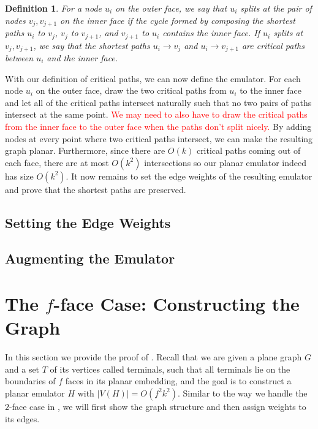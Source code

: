\documentclass[11pt]{article}
\newtheorem{definition}[theorem]{Definition}
\begin{document}
\begin{definition}
    For a node $u_i$ on the outer face, we say that $u_i$ splits at the pair of nodes $v_j,v_{j+1}$ on the inner face if the cycle formed by composing the shortest paths $u_i$ to $v_j$, $v_j$ to $v_{j+1}$, and $v_{j+1}$ to $u_i$ contains the inner face. If $u_i$ splits at $v_j,v_{j+1}$, we say that the shortest paths $u_i\to v_j$ and $u_i\to v_{j+1}$ are critical paths between $u_i$ and the inner face.
\end{definition}

With our definition of critical paths, we can now define the emulator. For each node $u_i$ on the outer face, draw the two critical paths from $u_i$ to the inner face and let all of the critical paths intersect naturally such that no two pairs of paths intersect at the same point. \textcolor{red}{We may need to also have to draw the critical paths from the inner face to the outer face when the paths don't split nicely.} By adding nodes at every point where two critical paths intersect, we can make the resulting graph planar. Furthermore, since there are $O(k)$ critical paths coming out of each face, there are at most $O(k^2)$ intersections so our planar emulator indeed has size $O(k^2)$. It now remains to set the edge weights of the resulting emulator and prove that the shortest paths are preserved.


\subsection{Setting the Edge Weights}

\subsection{Augmenting the Emulator}
\fi
\section{The $f$-face Case: Constructing the Graph}
\label{sec: main}

In this section we provide the proof of . Recall that we are given a plane graph $G$ and a set $T$ of its vertices called terminals, such that all terminals lie on the boundaries of $f$ faces in its planar embedding, and the goal is to construct a planar emulator $H$ with $|V(H)|=O(f^2k^2)$. 
Similar to the way we handle the $2$-face case in , we will first show the graph structure and then assign weights to its edges.
\end{document}
